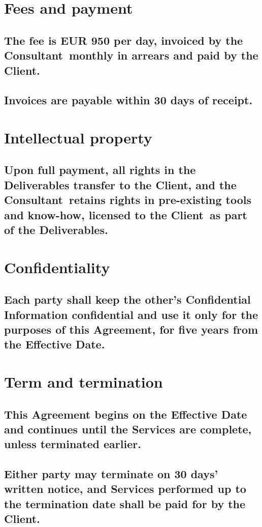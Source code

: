 \documentclass[11pt]{article}
\newcommand{\PartyAShort}{the Client}
\newcommand{\PartyBShort}{the Consultant}
\begin{document}
\section{Fees and payment}
\subsection{The fee is EUR 950 per day, invoiced by \PartyBShort\ monthly in arrears and paid by \PartyAShort.}
\subsection{Invoices are payable within 30 days of receipt.}

\section{Intellectual property}
\subsection{Upon full payment, all rights in the Deliverables transfer to \PartyAShort, and \PartyBShort\ retains rights in pre-existing tools and know-how, licensed to \PartyAShort\ as part of the Deliverables.}

\section{Confidentiality}
\subsection{Each party shall keep the other's Confidential Information confidential and use it only for the purposes of this Agreement, for five years from the Effective Date.}

\section{Term and termination}
\subsection{This Agreement begins on the Effective Date and continues until the Services are complete, unless terminated earlier.}
\subsection{Either party may terminate on 30 days' written notice, and Services performed up to the termination date shall be paid for by \PartyAShort.}
\end{document}
